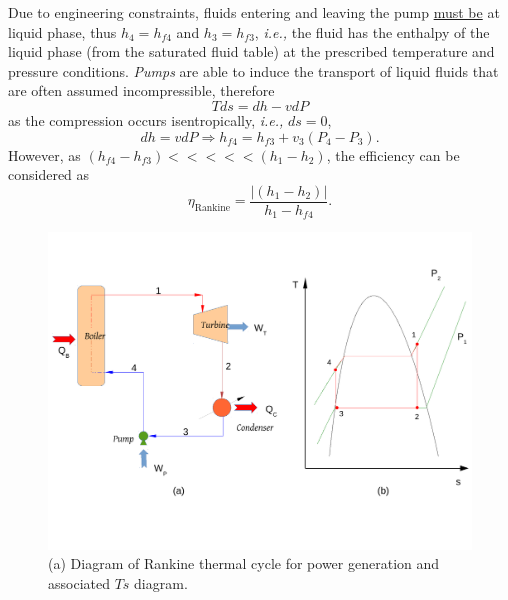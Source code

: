 \documentclass[12pts,a4paper,amsmath,amssymb,floatfix]{article}%
\newcommand{\frc}{\displaystyle\frac}
\newcommand{\ie}{{\it i.e., }}
\begin{document}
     Due to engineering constraints, fluids entering and leaving the pump \underline{must be} at liquid phase, thus $h_{4}=h_{f4}$ and $h_{3}=h_{f3}$, \ie the fluid has the enthalpy of the liquid phase (from the saturated fluid table) at the prescribed temperature and pressure conditions. {\it Pumps} are able to induce the transport of liquid fluids that are often assumed incompressible, therefore
          \begin{displaymath}
                Tds = dh - v dP
          \end{displaymath}
as the compression occurs isentropically, \ie $ds=0$,
          \begin{displaymath}
                dh = v dP \Rightarrow h_{f4} = h_{f3} + v_{3}\left(P_{4}-P_{3}\right).
          \end{displaymath}
However, as $\left(h_{f4}-h_{f3}\right) <<<<< \left(h_{1}-h_{2}\right)$, the efficiency can be considered as
           \begin{displaymath}
               \eta_{\text{Rankine}} = \frc{\left|\left(h_{1}-h_{2}\right)\right|}{h_{1}-h_{f4}}.
           \end{displaymath}     
%
   \begin{figure}[h]
      \begin{center}
         \includegraphics[width=\columnwidth,clip]{./Figs/Mod3PowerSystemDiagram}
      \end{center}
      \caption{ (a) Diagram of Rankine thermal cycle for power generation and associated $Ts$ diagram.}\label{Mod03Fig04}
   \end{figure}
\end{document}
